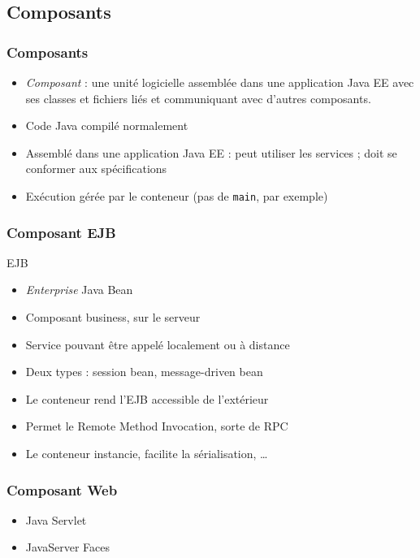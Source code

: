 \documentclass[english, french]{beamer}
\begin{document}
\subsection{Composants}
\begin{frame}
	\frametitle{Composants}
	\begin{itemize}
		\item \emph{Composant} : une unité logicielle assemblée dans une application Java EE avec ses classes et fichiers liés et communiquant avec d’autres composants.
		\item Code Java compilé normalement
		\item Assemblé dans une application Java EE : peut utiliser les services ; doit se conformer aux spécifications
		\item Exécution gérée par le conteneur (pas de \texttt{main}, par exemple)
	\end{itemize}
\end{frame}

\begin{frame}
	\frametitle{Composant EJB}
	\begin{block}{EJB}
		\begin{itemize}
			\item \emph{Enterprise} Java Bean
			\item Composant \og{}business\fg{}, sur le serveur
			\item Service pouvant être appelé localement ou à distance
			\item Deux types : session bean, message-driven bean
		\end{itemize}
	\end{block}
	\begin{itemize}
		\item Le conteneur rend l’EJB accessible de l’extérieur
		\item Permet le Remote Method Invocation, sorte de RPC
		\item Le conteneur instancie, facilite la sérialisation, …
	\end{itemize}
\end{frame}

\begin{frame}
	\frametitle{Composant Web}
	\begin{itemize}
		\item Java Servlet
		\item JavaServer Faces
	\end{itemize}
\end{frame}
\end{document}
